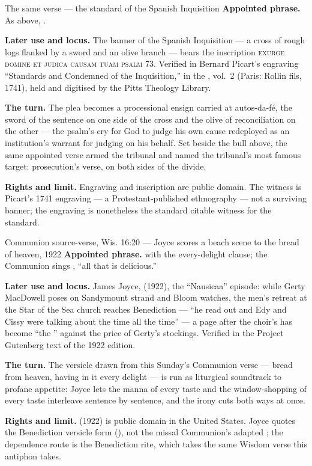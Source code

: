 \begin{afterlife}{The same verse --- the standard of the Spanish Inquisition}
\textbf{Appointed phrase.} As above, .

\textbf{Later use and locus.} The banner of the Spanish Inquisition --- a
cross of rough logs flanked by a sword and an olive branch --- bears the
inscription \textsc{exurge domine et judica causam tuam psalm 73}. Verified
in Bernard Picart's engraving ``Standards and Condemned of the Inquisition,''
in the , vol.~2 (Paris: Rollin fils, 1741), held and digitised by the Pitts
Theology Library.

\textbf{The turn.} The plea becomes a processional ensign carried at
autos-da-f\'e, the sword of the sentence on one side of the cross and the
olive of reconciliation on the other --- the psalm's cry for God to judge his
own cause redeployed as an institution's warrant for judging on his behalf.
Set beside the bull above, the same appointed verse armed the tribunal and
named the tribunal's most famous target: prosecution's verse, on both sides
of the divide.

\textbf{Rights and limit.} Engraving and inscription are public domain. The
witness is Picart's 1741 engraving --- a Protestant-published ethnography ---
not a surviving banner; the engraving is nonetheless the standard citable
witness for the standard.
\end{afterlife}

\begin{afterlife}{Communion source-verse, Wis. 16:20 --- Joyce scores a beach scene to the bread of heaven, 1922}
\textbf{Appointed phrase.}  with the every-delight
clause; the Communion sings , ``all that is
delicious.''

\textbf{Later use and locus.} James Joyce,  (1922), the
``Nausicaa'' episode: while Gerty MacDowell poses on Sandymount strand and
Bloom watches, the men's retreat at the Star of the Sea church reaches
Benediction --- ``he read out  and Edy
and Cissy were talking about the time all the time'' --- a page after the
choir's  has become ``the '' against the price of Gerty's stockings. Verified in the Project
Gutenberg text of the 1922 edition.

\textbf{The turn.} The versicle drawn from this Sunday's Communion verse ---
bread from heaven, having in it every delight --- is run as liturgical
soundtrack to profane appetite: Joyce lets the manna of every taste and the
window-shopping of every taste interleave sentence by sentence, and the irony
cuts both ways at once.

\textbf{Rights and limit.}  (1922) is public domain in the
United States. Joyce quotes the Benediction versicle form
(), not the missal Communion's adapted ; the dependence route is the Benediction rite, which takes the same
Wisdom verse this antiphon takes.
\end{afterlife}

